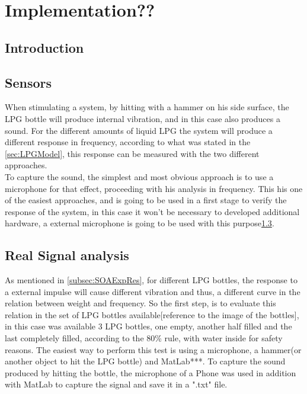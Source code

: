 \cleardoublepage
\chapter{Implementation??} \label{chap:trans}

\section{Introduction}
\section{Sensors} %
When stimulating a system, by hitting with a hammer on his side surface, the LPG bottle will produce internal vibration, and in this case also produces a sound. For the different amounts of liquid LPG the system will produce a different response in frequency, according to what was stated in the \ref{sec:LPGModel}, this response can be measured with the two different approaches.\\
To capture the sound, the simplest and most obvious approach is to use a microphone for that effect, proceeding with his analysis in frequency. This his one of the easiest approaches, and is going to be used in a first stage to verify the response of the system, in this case it won't be necessary to developed additional hardware, a external microphone is going to be used with this purpose\ref{sec:MIC}.\\






\section{Real Signal analysis}\label{sec:MIC}
As mentioned in \ref{subsec:SOAExpRes}, for different LPG bottles, the response to a external impulse will cause different vibration and thus, a different curve in the relation between weight and frequency. So the first step, is to evaluate this relation in the set of LPG bottles available[reference to the image of the bottles], in this case was available 3 LPG bottles, one empty, another half filled and the last completely filled, according to the 80\% rule, with water inside for safety reasons. The easiest way to perform this test is using a microphone, a hammer(or another object to hit the LPG bottle) and MatLab***. To capture the sound produced by hitting the bottle, the microphone of a Phone was used in addition with MatLab to capture the signal and save it in a ".txt" file.
